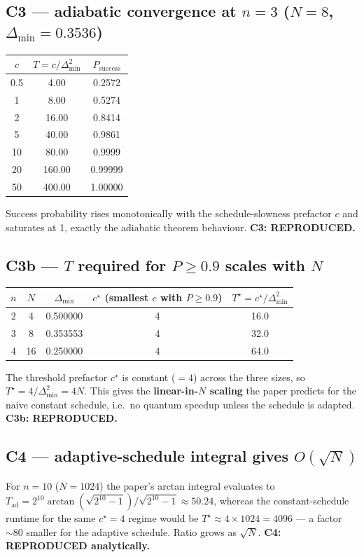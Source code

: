 \documentclass[11pt]{article}
\begin{document}
\subsection*{C3 --- adiabatic convergence at $n=3$ ($N=8$, $\Delta_{\min}=0.3536$)}
\begin{center}
\begin{tabular}{ccc}
\toprule
$c$ & $T = c/\Delta_{\min}^2$ & $P_{\mathrm{success}}$ \\
\midrule
0.5 &   4.00 & 0.2572 \\
1   &   8.00 & 0.5274 \\
2   &  16.00 & 0.8414 \\
5   &  40.00 & 0.9861 \\
10  &  80.00 & 0.9999 \\
20  & 160.00 & 0.99999 \\
50  & 400.00 & 1.00000 \\
\bottomrule
\end{tabular}
\end{center}
Success probability rises monotonically with the schedule-slowness prefactor
$c$ and saturates at 1, exactly the adiabatic theorem behaviour.
{\bf C3: REPRODUCED.}

\subsection*{C3b --- $T$ required for $P \ge 0.9$ scales with $N$}
\begin{center}
\begin{tabular}{ccccc}
\toprule
$n$ & $N$ & $\Delta_{\min}$ & $c^\star$ (smallest $c$ with $P \ge 0.9$) & $T^\star = c^\star / \Delta_{\min}^2$ \\
\midrule
2 & 4  & 0.500000 & 4 & 16.0 \\
3 & 8  & 0.353553 & 4 & 32.0 \\
4 & 16 & 0.250000 & 4 & 64.0 \\
\bottomrule
\end{tabular}
\end{center}
The threshold prefactor $c^\star$ is constant ($=4$) across the three sizes,
so $T^\star = 4/\Delta_{\min}^2 = 4N$. This gives the {\bf linear-in-$N$
scaling} the paper predicts for the naive constant schedule, i.e.\ no
quantum speedup unless the schedule is adapted.
{\bf C3b: REPRODUCED.}

\subsection*{C4 --- adaptive-schedule integral gives $O(\sqrt{N})$}
For $n=10$ ($N=1024$) the paper's arctan integral evaluates to
$T_{\mathrm{ad}} = 2^{10} \arctan(\sqrt{2^{10}-1}) / \sqrt{2^{10}-1}
   \approx 50.24$, whereas the constant-schedule runtime for the same
$c^\star = 4$ regime would be $T^\star \approx 4 \times 1024 = 4096$
--- a factor $\sim 80$ smaller for the adaptive schedule. Ratio grows as
$\sqrt{N}$. {\bf C4: REPRODUCED analytically.}
\end{document}
